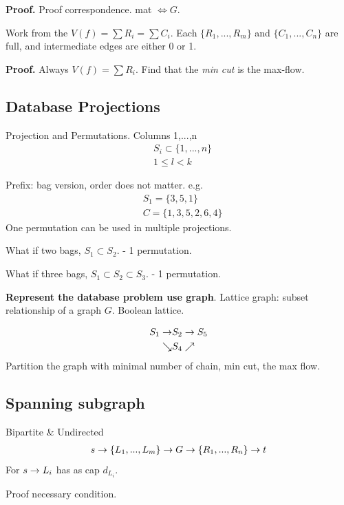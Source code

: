 \documentclass[a4paper]{report}
\begin{document}
\textbf{Proof.} Proof correspondence. mat $\Leftrightarrow G$. 

Work from the $V(f)=\sum R_i =\sum C_i$. Each $\{R_1, ..., R_m\}$ and $\{C_1, ..., C_n\}$ are full, and intermediate edges are either 0 or 1. 

\textbf{Proof.} Always $V(f)=\sum R_i$. Find that the \textit{min cut} is the max-flow.
\subsection{Database Projections}
Projection and Permutations.
Columns 1,...,n
\begin{align*}
& S_i \subset \{1,..., n\}\\
& 1 \leq l < k
\end{align*}

Prefix: bag version, order does not matter. e.g.
\begin{align*}
& S_1 = \{3, 5, 1\} \\
& C= \{1, 3,5, 2, 6, 4\}
\end{align*}
One permutation can be used in multiple projections. 

What if two bags, $S_1 \subset S_2$. - 1 permutation.

What if three bags, $S_1 \subset S_2 \subset S_3$. - 1 permutation.

\textbf{Represent the database problem use graph}. Lattice graph: subset relationship of a graph $G$. Boolean lattice.

\begin{align*}
S_1 \rightarrow & S_2 \rightarrow S_5\\
\searrow & S_4 \nearrow
\end{align*}
Partition the graph with minimal number of chain, min cut, the max flow. 
\subsection{Spanning subgraph}
Bipartite \& Undirected
\begin{align*}
s \rightarrow \{L_1, ..., L_m\} \rightarrow G \rightarrow \{R_1, ..., R_n\} \rightarrow t
\end{align*}
For $s \rightarrow L_i$ has as cap $d_{L_i}$. 

Proof necessary condition. 
\end{document}
